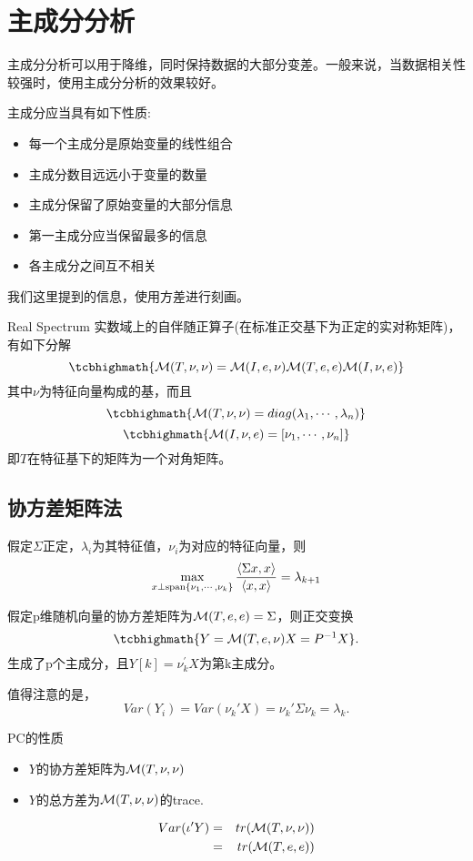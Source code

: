 \section{主成分分析}
主成分分析可以用于降维，同时保持数据的大部分变差。一般来说，当数据相关性较强时，使用主成分分析的效果较好。

\begin{sdefinition}{}{}
主成分应当具有如下性质:
\begin{itemize}
	\item 每一个主成分是原始变量的线性组合
	\item 主成分数目远远小于变量的数量
	\item 主成分保留了原始变量的大部分信息
	\item 第一主成分应当保留最多的信息
	\item 各主成分之间互不相关
\end{itemize}	                                                                    
\end{sdefinition}
\begin{sremark}{}{}
我们这里提到的信息，使用方差进行刻画。
\end{sremark}

\begin{stheorem}{Real Spectrum}{}
实数域上的自伴随正算子(在标准正交基下为正定的实对称矩阵)，有如下分解
$$
\tcbhighmath{\M(T,\nu,\nu) = \M(I,e,\nu)\M(T,e,e)\M(I,\nu,e)}
$$
其中$\nu$为特征向量构成的基，而且
$$
\tcbhighmath{\M(T,\nu,\nu) = diag(\lambda_1,\cdots,\lambda_n)}
$$
$$
\tcbhighmath{\M(I,\nu,e)=[\nu_1,\cdots,\nu_n]} 
$$
即$T$在特征基下的矩阵为一个对角矩阵。
\end{stheorem}

\subsection{协方差矩阵法}
\begin{stheorem}{}{}
假定$\Sigma$正定，$\lambda_i$为其特征值，$\nu_i$为对应的特征向量，则
$$
\max_{x \perp \text{span}\{\nu_1,\cdots,\nu_k\}} \frac{{\langle \Sigma x,x\rangle}}{{\langle x,x\rangle}} = \lambda_{k+1}
$$
\end{stheorem}


\begin{stheorem}{}{}
假定p维随机向量的协方差矩阵为$\mathcal{M}(T,e,e)=\Sigma$，则正交变换
$$
\tcbhighmath{Y = \M(T,e,\nu) X=P^{-1} X}.
$$
生成了p个主成分，且$Y[k]=\nu_k^\prime X$为第k主成分。
\end{stheorem}
值得注意的是，
$$
Var(Y_i) = Var(\nu_k \prime X) = \nu_k \prime \Sigma \nu_k = \lambda_k.
$$
\begin{stheorem}{PC的性质}{}
\begin{itemize}
	\item $Y$的协方差矩阵为$\mathcal{M}(T,\nu,\nu)$
	\item $Y$的总方差为$\mathcal{M}(T,\nu,\nu)$的trace.
\end{itemize}
\end{stheorem}
\begin{Proof}
\begin{eqnarray*}
	Var(\iota^\prime Y) &=& tr(\mathcal{M}(T,\nu,\nu)) \\
	&=& tr(\mathcal{M}(T,e,e))
\end{eqnarray*}
\end{Proof}

